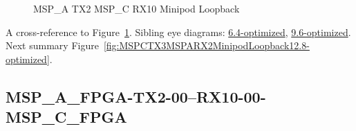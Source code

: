 \begin{figure}[h]
\begin{subfigure}{0.33\textwidth}
\hyperref[sec:MSPAFPGATX206RX1006MSPCFPGA12.8-optimized]{}
\end{subfigure}\hspace*{\fill}
\begin{subfigure}{0.33\textwidth}
\hyperref[sec:MSPAFPGATX207RX1007MSPCFPGA12.8-optimized]{}
\end{subfigure}\hspace*{\fill}
\begin{subfigure}{0.33\textwidth}
\hyperref[sec:MSPAFPGATX208RX1008MSPCFPGA12.8-optimized]{}
\end{subfigure}

\begin{subfigure}{0.33\textwidth}
\hyperref[sec:MSPAFPGATX209RX1009MSPCFPGA12.8-optimized]{}
\end{subfigure}\hspace*{\fill}
\begin{subfigure}{0.33\textwidth}
\hyperref[sec:MSPAFPGATX210RX1010MSPCFPGA12.8-optimized]{}
\end{subfigure}\hspace*{\fill}
\begin{subfigure}{0.33\textwidth}
\hyperref[sec:MSPAFPGATX211RX1011MSPCFPGA12.8-optimized]{}
\end{subfigure}

\caption{MSP\_A TX2 MSP\_C RX10 Minipod Loopback} \label{fig:MSPATX2MSPCRX10MinipodLoopback12.8-optimized}
\end{figure}

A cross-reference to Figure~\ref{fig:MSPATX2MSPCRX10MinipodLoopback12.8-optimized}.
Sibling eye diagrams: \hyperref[sec:MSPATX2MSPCRX10MinipodLoopback6.4-optimized]{6.4-optimized}, \hyperref[sec:MSPATX2MSPCRX10MinipodLoopback9.6-optimized]{9.6-optimized}. \\
Next summary Figure~\ref{fig:MSPCTX3MSPARX2MinipodLoopback12.8-optimized}.
\clearpage
% 
\subsection{MSP\_A\_FPGA-TX2-00--RX10-00-MSP\_C\_FPGA}\label{sec:MSPAFPGATX200RX1000MSPCFPGA12.8-optimized}

